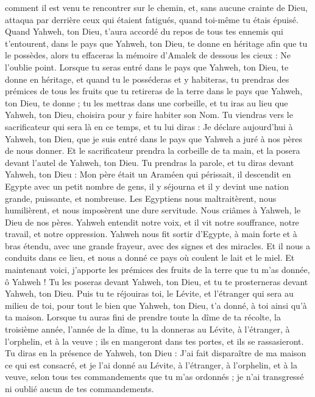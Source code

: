 \begin{multicols}{2}
comment il est venu te rencontrer sur le chemin, et, sans aucune crainte de Dieu, attaqua par derrière ceux qui étaient fatigués, quand toi-même tu étais épuisé.
Quand Yahweh, ton Dieu, t'aura accordé du repos de tous tes ennemis qui t'entourent, dans le pays que Yahweh, ton Dieu, te donne en héritage afin que tu le possèdes, alors tu effaceras la mémoire d'Amalek de dessous les cieux : Ne l'oublie point.
\VerseOne{}Lorsque tu seras entré dans le pays que Yahweh, ton Dieu, te donne en héritage, et quand tu le posséderas et y habiteras,
tu prendras des prémices de tous les fruits que tu retireras de la terre dans le pays que Yahweh, ton Dieu, te donne ; tu les mettras dans une corbeille, et tu iras au lieu que Yahweh, ton Dieu, choisira pour y faire habiter son Nom.
Tu viendras vers le sacrificateur qui sera là en ce temps, et tu lui diras : Je déclare aujourd'hui à Yahweh, ton Dieu, que je suis entré dans le pays que Yahweh a juré à nos pères de nous donner.
Et le sacrificateur prendra la corbeille de ta main, et la posera devant l'autel de Yahweh, ton Dieu.
Tu prendras la parole, et tu diras devant Yahweh, ton Dieu : Mon père était un Araméen qui périssait, il descendit en Egypte avec un petit nombre de gens, il y séjourna et il y devint une nation grande, puissante, et nombreuse.
Les Egyptiens nous maltraitèrent, nous humilièrent, et nous imposèrent une dure servitude.
Nous criâmes à Yahweh, le Dieu de nos pères. Yahweh entendit notre voix, et il vit notre souffrance, notre travail, et notre oppression.
Yahweh nous fit sortir d'Egypte, à main forte et à bras étendu, avec une grande frayeur, avec des signes et des miracles.
Et il nous a conduits dans ce lieu, et nous a donné ce pays où coulent le lait et le miel.
Et maintenant voici, j'apporte les prémices des fruits de la terre que tu m'as donnée, ô Yahweh ! Tu les poseras devant Yahweh, ton Dieu, et tu te prosterneras devant Yahweh, ton Dieu.
Puis tu te réjouiras toi, le Lévite, et l'étranger qui sera au milieu de toi, pour tout le bien que Yahweh, ton Dieu, t'a donné, à toi ainsi qu'à ta maison.
Lorsque tu auras fini de prendre toute la dîme de ta récolte, la troisième année, l'année de la dîme, tu la donneras au Lévite, à l'étranger, à l'orphelin, et à la veuve ; ils en mangeront dans tes portes, et ils se rassasieront.
Tu diras en la présence de Yahweh, ton Dieu : J'ai fait disparaître de ma maison ce qui est consacré, et je l'ai donné au Lévite, à l'étranger, à l'orphelin, et à la veuve, selon tous tes commandements que tu m'as ordonnés ; je n'ai transgressé ni oublié aucun de tes commandements.

\end{multicols}
